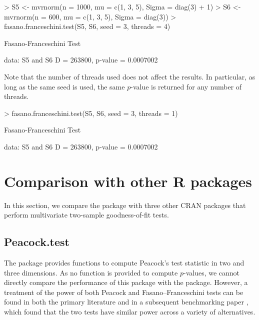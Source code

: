 \begin{example}
> S5 <- mvrnorm(n = 1000, mu = c(1, 3, 5), Sigma = diag(3) + 1)
> S6 <- mvrnorm(n = 600, mu = c(1, 3, 5), Sigma = diag(3))
> fasano.franceschini.test(S5, S6, seed = 3, threads = 4)

	Fasano-Franceschini Test

data:  S5 and S6
D = 263800, p-value = 0.0007002
\end{example}

Note that the number of threads used does not affect the results. In particular, as long as the same seed is used, the same $p$-value is returned for any number of threads.
\begin{example}
> fasano.franceschini.test(S5, S6, seed = 3, threads = 1)

	Fasano-Franceschini Test

data:  S5 and S6
D = 263800, p-value = 0.0007002
\end{example}


\section{Comparison with other R packages}
In this section, we compare the  package with three other CRAN packages that perform multivariate two-sample goodness-of-fit tests.

\subsection{Peacock.test}
The  package \citep{peacockR} provides functions to compute Peacock's test statistic \citep{peacock_1983} in two and three dimensions. As no function is provided to compute $p$-values, we cannot directly compare the performance of this package with the  package. However, a treatment of the power of both Peacock and Fasano--Franceschini tests can be found in both the primary literature \citep{peacock_1983,ff1987} and in a subsequent benchmarking paper \citep{lopes_2007}, which found that the two tests have similar power across a variety of alternatives.

